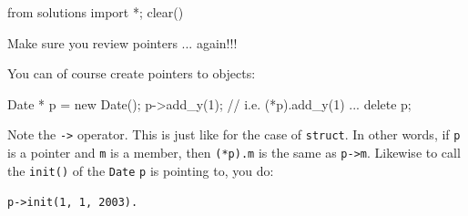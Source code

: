\begin{python0}
from solutions import *; clear()
\end{python0}

Make sure you review pointers ... again!!!

You can of course create pointers to objects:

\begin{consolethree}[escapeinside=||]
Date * p = new Date();
p->add_y(1); // i.e. (*p).add_y(1)
...
delete p;
\end{consolethree}

Note the \verb!->! operator. This is just like for the case
of \texttt{struct}. In other words, if \texttt{p} is a pointer and \texttt{m}
is a member, then \texttt{(*p).m} is the same as \verb!p->m!.
Likewise to call the \texttt{init()} of the \texttt{Date} \texttt{p} is
pointing to, you do:

\verb!p->init(1, 1, 2003).!













